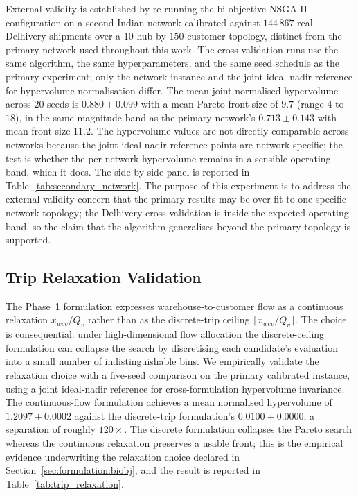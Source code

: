 \documentclass[review,preprint,authoryear,12pt]{elsarticle}
\begin{document}
External validity is established by re-running the bi-objective
NSGA-II configuration on a second Indian network calibrated against
$144\,867$ real Delhivery shipments over a $10$-hub by $150$-customer
topology, distinct from the primary network used throughout this
work. The cross-validation runs use the same algorithm, the same
hyperparameters, and the same seed schedule as the primary
experiment; only the network instance and the joint ideal-nadir
reference for hypervolume normalisation differ. The mean
joint-normalised hypervolume across $20$ seeds is
$0.880 \pm 0.099$ with a mean Pareto-front size of $9.7$ (range $4$
to $18$), in the same magnitude band as the primary network's
$0.713 \pm 0.143$ with mean front size $11.2$. The hypervolume values
are not directly comparable across networks because the joint
ideal-nadir reference points are network-specific; the test is
whether the per-network hypervolume remains in a sensible operating
band, which it does. The side-by-side panel is reported in
Table~\ref{tab:secondary_network}. The purpose of this experiment is
to address the external-validity concern that the primary results
may be over-fit to one specific network topology; the Delhivery
cross-validation is inside the expected operating band, so the claim
that the algorithm generalises beyond the primary topology is
supported.

\begin{table}[H]
\centering
\caption{Side-by-side comparison of NSGA-II hypervolume on the
primary calibrated network and the Delhivery $10$-hub by
$150$-customer secondary network.}
\label{tab:secondary_network}

\end{table}

\subsection{Trip Relaxation Validation}
\label{sec:experiments:trip_relaxation}

The Phase~1 formulation expresses warehouse-to-customer flow as a
continuous relaxation $x_{wcv} / Q_v$ rather than as the
discrete-trip ceiling $\lceil x_{wcv} / Q_v \rceil$. The choice is
consequential: under high-dimensional flow allocation the
discrete-ceiling formulation can collapse the search by discretising
each candidate's evaluation into a small number of indistinguishable
bins. We empirically validate the relaxation choice with a five-seed
comparison on the primary calibrated instance, using a joint
ideal-nadir reference for cross-formulation hypervolume invariance.
The continuous-flow formulation achieves a mean normalised hypervolume
of $1.2097 \pm 0.0002$ against the discrete-trip formulation's
$0.0100 \pm 0.0000$, a separation of roughly $120 \times$. The
discrete formulation collapses the Pareto search whereas the
continuous relaxation preserves a usable front; this is the empirical
evidence underwriting the relaxation choice declared in
Section~\ref{sec:formulation:biobj}, and the result is reported in
Table~\ref{tab:trip_relaxation}.
\end{document}
